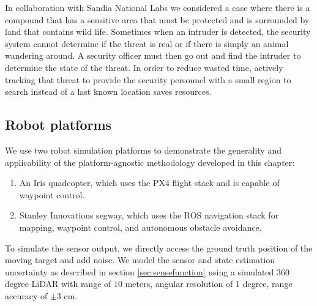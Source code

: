 



In collaboration with Sandia National Labs we considered a case where there is a compound that has a sensitive area that must be protected and is surrounded by land that contains wild life. Sometimes when an intruder is detected, the security system cannot determine if the threat is real or if there is simply an animal wandering around. A security officer must then go out and find the intruder to determine the state of the threat. In order to reduce wasted time, actively tracking that threat to provide the security personnel with a small region to search instead of a last known location saves resources. 






\subsection{Robot platforms}

We use two robot simulation platforms to demonstrate the generality and applicability of the platform-agnostic methodology developed in this chapter:
\begin{enumerate}
    \item An Iris quadcopter, which uses the PX4 flight stack and is capable of waypoint control.
    \item Stanley Innovations segway, which uses the ROS navigation stack for mapping, waypoint control, and autonomous obstacle avoidance. 
\end{enumerate}
To simulate the sensor output, we directly access the ground truth position of the moving target and add noise. We model the sensor and state estimation uncertainty as described in section \ref{sec:sensefunction} using a simulated 360 degree LiDAR with range of  $10$ meters, angular resolution of 1 degree, range accuracy of $\pm 3$ cm.


